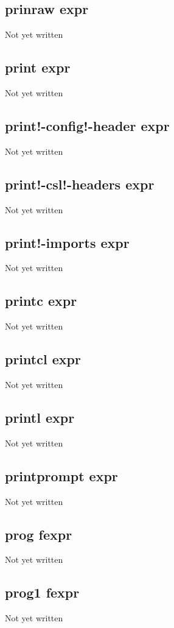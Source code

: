 \documentclass[a4paper,11pt]{article}
\begin{document}
{\subsection{\ttfamily prinraw expr}
Not yet written

\subsection{\ttfamily print expr}
Not yet written

\subsection{\ttfamily print!-config!-header expr}
Not yet written

\subsection{\ttfamily print!-csl!-headers expr}
Not yet written

\subsection{\ttfamily print!-imports expr}
Not yet written

\subsection{\ttfamily printc expr}
Not yet written

\subsection{\ttfamily printcl expr}
Not yet written

\subsection{\ttfamily printl expr}
Not yet written

\subsection{\ttfamily printprompt expr}
Not yet written

\subsection{\ttfamily prog fexpr}
Not yet written

\subsection{\ttfamily prog1 fexpr}
Not yet written

}
\end{document}
